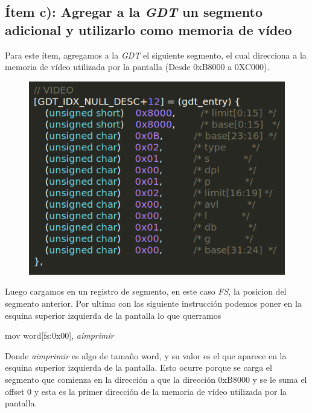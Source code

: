 \subsection{Ítem c): Agregar a la \textit{GDT}  un segmento adicional y utilizarlo como memoria de vídeo}

Para este ítem, agregamos a la \textit{GDT} el siguiente segmento, el cual direcciona a la memoria de vídeo utilizada por la pantalla (Desde 0xB8000 a 0XC000).

\begin{figure}[H]
\begin{center}
  \includegraphics[width=\linewidth]{ejercicio1/memvid.png}
  \caption{{\small}} 
\endminipage
\end{center}
\end{figure}


Luego cargamos en un registro de segmento, en este caso  \textit{FS}, la posicion del segmento anterior. Por ultimo con las siguiente instrucción podemos poner en la esquina superior izquierda de la pantalla lo que querramos
\begin{center}
mov word[fs:0x00],  \textit{aimprimir}
\end{center}

Donde  \textit{aimprimir} es algo de tamaño word, y su valor es el que aparece en la esquina superior izquierda de la pantalla. Esto ocurre porque se carga el segmento que comienza en la dirección a que la dirección 0xB8000 y se le suma el offset 0 y esta es la primer dirección de la memoria de vídeo utilizada por la pantalla.\\

